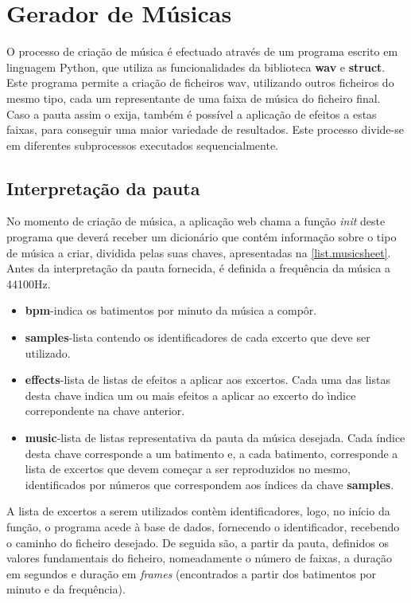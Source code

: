 \documentclass{report}
\begin{document}
\chapter{Gerador de Músicas}
\label{chap.audio}

O processo de criação de música é efectuado através de um programa escrito em linguagem Python, que utiliza as funcionalidades da biblioteca \textbf{wav} e \textbf{struct}. Este programa permite a criação de ficheiros \ac{wav}, utilizando outros ficheiros do mesmo tipo, cada um representante de uma faixa de música do ficheiro final. Caso a pauta assim o exija, também é possível a aplicação de efeitos a estas faixas, para conseguir uma maior variedade de resultados. Este processo divide-se em diferentes subprocessos executados sequencialmente.

\section{Interpretação da pauta}
\label{sec.pauta}

No momento de criação de música, a aplicação web chama a função \textit{init} deste programa que deverá receber um dicionário que contém informação sobre o tipo de música a criar, dividida pelas suas chaves, apresentadas na \autoref{list.musicsheet}. Antes da interpretação da pauta fornecida, é definida a frequência da música a 44100Hz.

\begin{itemize}
	\item \textbf{bpm}-indica os batimentos por minuto da música a compôr.
	\item \textbf{samples}-lista contendo os identificadores de cada excerto que deve ser utilizado.
	\item \textbf{effects}-lista de listas de efeitos a aplicar aos excertos. Cada uma das listas desta chave indica um ou mais efeitos a aplicar ao excerto do ìndice correpondente na chave anterior.
	\item \textbf{music}-lista de listas representativa da pauta da música desejada. Cada índice desta chave corresponde a um batimento e, a cada batimento, corresponde a lista de excertos que devem começar a ser reproduzidos no mesmo, identificados por números que correspondem aos índices da chave \textbf{samples}.
	      \label{list.musicsheet}
\end{itemize}

A lista de excertos a serem utilizados contèm identificadores, logo, no início da função, o programa acede à base de dados, fornecendo o identificador, recebendo o caminho do ficheiro desejado. De seguida são, a partir da pauta, definidos os valores fundamentais do ficheiro, nomeadamente o número de faixas, a duração em segundos e duração em \textit{frames} (encontrados a partir dos batimentos por minuto e da frequência).
\end{document}
